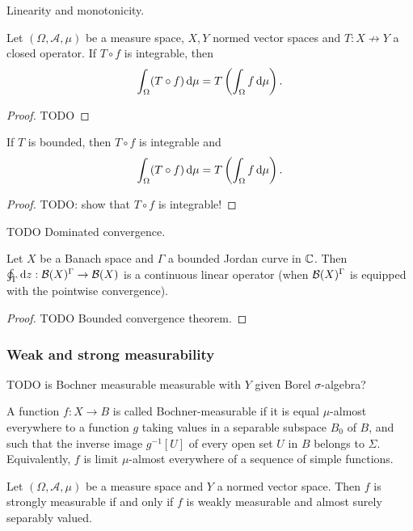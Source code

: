\begin{proposition}
Linearity and monotonicity.
\end{proposition}

\begin{theorem} \label{HilleTheorem}
Let $(\Omega, \mathcal{A},\mu)$ be a measure space, $X,Y$ normed vector spaces and $T: X\not\to Y$ a closed operator. If $T\circ f$ is integrable, then
\[ \int_\Omega (T\circ f)\operatorname{d \!}{\mu} = T\left(\int_\Omega f\operatorname{d \!}{\mu}\right). \]
\end{theorem}
\begin{proof}
TODO
\end{proof}
\begin{corollary} \label{boundedOperatorUnderIntegral}
If $T$ is bounded, then $T\circ f$ is integrable and
\[ \int_\Omega (T\circ f)\operatorname{d \!}{\mu} = T\left(\int_\Omega f\operatorname{d \!}{\mu}\right). \]
\end{corollary}
\begin{proof}
TODO: show that $T\circ f$ is integrable!
\end{proof}

TODO Dominated convergence.

\begin{lemma} \label{pathIntegralContinuousOperator}
Let $X$ be a Banach space and $\Gamma$ a bounded Jordan curve in $\mathbb{C}$. Then $\oint_\Gamma\operatorname{d \!}{z}: \operatorname{\mathcal{B}}(X)^\Gamma \to \operatorname{\mathcal{B}}(X)$ is a continuous linear operator (when $\operatorname{\mathcal{B}}(X)^\Gamma$ is equipped with the pointwise convergence).
\end{lemma}
\begin{proof}
TODO Bounded convergence theorem.
\end{proof}

\subsubsection{Weak and strong measurability}
TODO is Bochner measurable measurable with $Y$ given Borel $\sigma$-algebra?

A function $f:X\to B$ is called Bochner-measurable if it is equal $\mu$-almost everywhere to a function $g$ taking values in a separable subspace $B_{0}$ of $B$, and such that the inverse image $g^{-1}[U]$ of every open set $U$ in $B$ belongs to $\Sigma$. Equivalently, $f$ is limit $\mu$-almost everywhere of a sequence of simple functions. 

\begin{theorem}
Let $(\Omega, \mathcal{A},\mu)$ be a measure space and $Y$ a normed vector space. Then $f$ is strongly measurable \textup{if and only if} $f$ is weakly measurable and almost surely separably valued.
\end{theorem}


